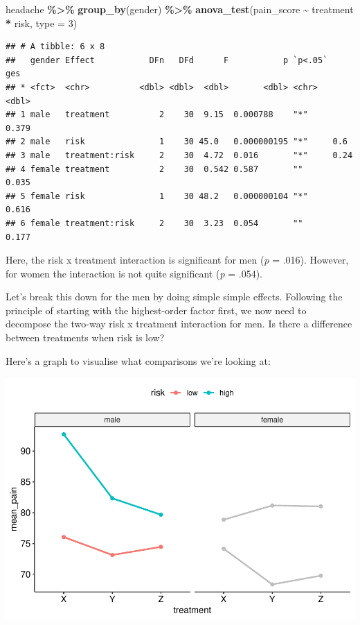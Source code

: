 \documentclass[
]{book}
\newenvironment{Shaded}{\begin{snugshade}}{\end{snugshade}}
\newcommand{\AttributeTok}[1]{\textcolor[rgb]{0.13,0.29,0.53}{#1}}
\newcommand{\DecValTok}[1]{\textcolor[rgb]{0.00,0.00,0.81}{#1}}
\newcommand{\FunctionTok}[1]{\textcolor[rgb]{0.13,0.29,0.53}{\textbf{#1}}}
\newcommand{\NormalTok}[1]{#1}
\newcommand{\SpecialCharTok}[1]{\textcolor[rgb]{0.81,0.36,0.00}{\textbf{#1}}}
\begin{document}
\begin{Shaded}
\begin{Highlighting}[]
\NormalTok{headache }\SpecialCharTok{\%\textgreater{}\%}
  \FunctionTok{group\_by}\NormalTok{(gender) }\SpecialCharTok{\%\textgreater{}\%}
  \FunctionTok{anova\_test}\NormalTok{(pain\_score }\SpecialCharTok{\textasciitilde{}}\NormalTok{ treatment }\SpecialCharTok{*}\NormalTok{ risk, }\AttributeTok{type =} \DecValTok{3}\NormalTok{)}
\end{Highlighting}
\end{Shaded}

\begin{verbatim}
## # A tibble: 6 x 8
##   gender Effect           DFn   DFd      F           p `p<.05`   ges
## * <fct>  <chr>          <dbl> <dbl>  <dbl>       <dbl> <chr>   <dbl>
## 1 male   treatment          2    30  9.15  0.000788    "*"     0.379
## 2 male   risk               1    30 45.0   0.000000195 "*"     0.6  
## 3 male   treatment:risk     2    30  4.72  0.016       "*"     0.24 
## 4 female treatment          2    30  0.542 0.587       ""      0.035
## 5 female risk               1    30 48.2   0.000000104 "*"     0.616
## 6 female treatment:risk     2    30  3.23  0.054       ""      0.177
\end{verbatim}

Here, the risk x treatment interaction is significant for men (\emph{p} = .016). However, for women the interaction is not quite significant (\emph{p} = .054).

Let's break this down for the men by doing simple simple effects. Following the principle of starting with the highest-order factor first, we now need to decompose the two-way risk x treatment interaction for men. Is there a difference between treatments when risk is low?

Here's a graph to visualise what comparisons we're looking at:

\includegraphics{_main_files/figure-latex/unnamed-chunk-274-1.pdf}
\end{document}
